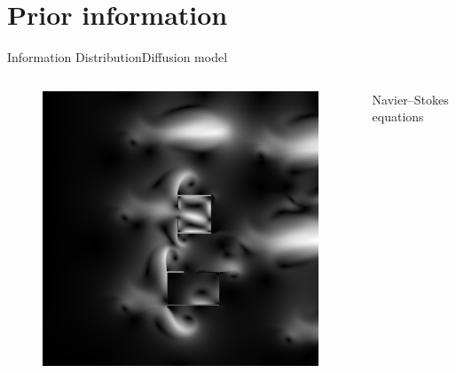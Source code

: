 \section{Prior information}

\begin{frame}{Information Distribution}{Diffusion model}

\begin{columns}
\begin{figure}
\centering
\includegraphics[width = \textwidth]{./screenshot/diffusion.png}
\end{figure}

\begin{minipage}{\textwidth}
Navier–Stokes equations
\end{minipage}
\end{columns}

\end{frame}

